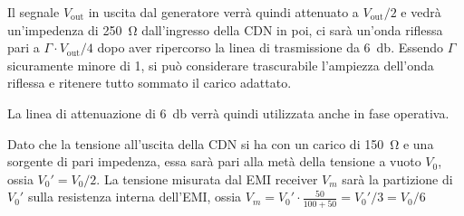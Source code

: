 Il segnale $V_{\text{out}}$ in uscita dal generatore
verrà quindi attenuato a $V_{\text{out}}/2$ e vedrà un'impedenza
di \SI{250}{\ohm} dall'ingresso della CDN in poi, ci sarà un'onda
riflessa pari a $\Gamma\cdot V_{\text{out}}/4$ dopo aver ripercorso la linea 
di trasmissione da \SI{6}{\decibel}. Essendo $\Gamma$ sicuramente minore di 1,
si può considerare trascurabile l'ampiezza dell'onda riflessa e ritenere tutto
sommato il carico adattato.

La linea di attenuazione di \SI{6}{\decibel} verrà quindi utilizzata anche in fase 
operativa.

Dato che la tensione all'uscita della CDN si ha con un carico di \SI{150}{\ohm} e 
una sorgente di pari impedenza, essa sarà pari alla metà della tensione a 
vuoto $V_0$, ossia $V_0' = V_0/2$. La tensione misurata dal EMI receiver
$V_m$ sarà la partizione di $V_0'$ sulla resistenza interna dell'EMI, ossia
$V_m = V_0' \cdot \frac{50}{100+50} = V_0'/3 = V_0/6$
